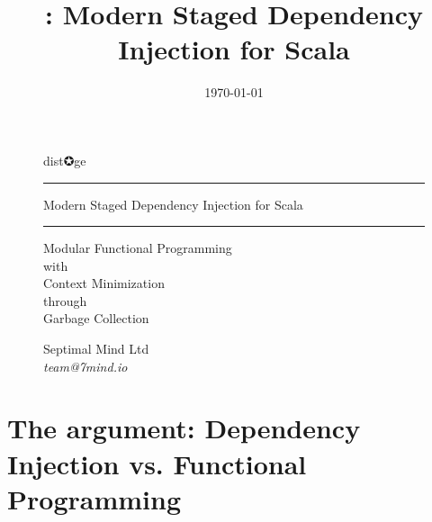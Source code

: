 \documentclass[usenames,dvipsnames]{beamer}
\title[\distage]{\distage: Modern Staged Dependency Injection for Scala}
\institute[Septimal Mind Ltd]
    {
    Septimal Mind Ltd\\
    \medskip
    \textit{team@7mind.io}
    }
\date{\today}
\begin{document}

\begin{frame}
\begin{figure}
\Huge
\color{RubineRed} dist✪ge
\noindent
\rule{\linewidth}{1mm}
\Large Modern Staged Dependency Injection for Scala
\rule{\linewidth}{1mm}
\end{figure}

\begin{figure}
\color{RubineRed}
\normalsize Modular Functional Programming \\
with \\
Context Minimization \\
through \\
Garbage Collection
\end{figure}

\begin{figure}
\Large Septimal Mind Ltd \\
\medskip
\textit{team@7mind.io}
\end{figure}

\end{frame}

\section{The argument: Dependency Injection vs. Functional Programming}
\end{document}
